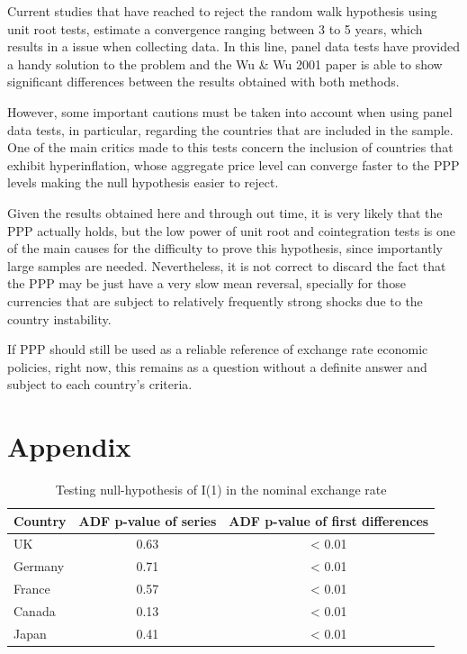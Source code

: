 \documentclass[]{article}
\begin{document}
Current studies that have reached to reject the random walk hypothesis using unit root tests, estimate a convergence ranging between 3 to 5 years, which results in a issue when collecting data. In this line, panel data tests have provided a handy solution to the problem and the Wu \& Wu 2001 paper is able to show significant differences between the results obtained with both methods.

However, some important cautions must be taken into account when using panel data tests, in particular, regarding the countries that are included in the sample. One of the main critics made to this tests concern the inclusion of countries that exhibit hyperinflation, whose aggregate price level can converge faster to the PPP levels making the null hypothesis easier to reject.

Given the results obtained here and through out time, it is very likely that the PPP actually holds, but the low power of unit root and cointegration tests is one of the main causes for the difficulty to prove this hypothesis, since importantly large samples are needed. Nevertheless, it is not correct to discard the fact that the PPP may be just have a very slow mean reversal, specially for those currencies that are subject to relatively frequently strong shocks due to the country instability.

If PPP should still be used as a reliable reference of exchange rate economic policies, right now, this remains as a question without a definite answer and subject to each country's criteria.

\hypertarget{appendix}{%
\section{Appendix}\label{appendix}}

\listoftables

\begin{table}

\caption{\label{tab:ner}Testing null-hypothesis of I(1) in the nominal exchange rate}
\centering
\begin{tabular}[t]{lcc}
\toprule
Country & ADF p-value of series & ADF p-value of first differences\\
\midrule
UK & 0.63 & < 0.01\\
Germany & 0.71 & < 0.01\\
France & 0.57 & < 0.01\\
Canada & 0.13 & < 0.01\\
Japan & 0.41 & < 0.01\\
\bottomrule
\end{tabular}
\end{table}
\end{document}
